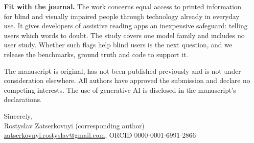 \documentclass[11pt,a4paper]{article}
\begin{document}
\textbf{Fit with the journal.} The work concerns equal access to printed information for blind and visually impaired people through technology already in everyday use. It gives developers of assistive reading apps an inexpensive safeguard: telling users which words to doubt. The study covers one model family and includes no user study. Whether such flags help blind users is the next question, and we release the benchmarks, ground truth and code to support it.

The manuscript is original, has not been published previously and is not under consideration elsewhere. All authors have approved the submission and declare no competing interests. The use of generative AI is disclosed in the manuscript's declarations.

Sincerely,\\[0.4em]
Rostyslav Zatserkovnyi (corresponding author)\\
\href{mailto:zatserkovnyi.rostyslav@gmail.com}{zatserkovnyi.rostyslav@gmail.com}, ORCID 0000-0001-6991-2866
\end{document}
